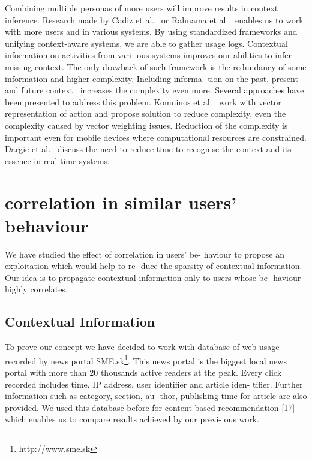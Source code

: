 \documentclass{acm_proc_article-sp} %
\begin{document}
Combining multiple personas of more users will improve
results in context inference. Research made by Cadiz et al.~\cite{cadiz2009orchestrating}
or Rahnama et al.~\cite{rahnama2011campus} enables us to work with more users
and in various systems. By using standardized frameworks
and unifying context-aware systems, we are able to gather
usage logs. Contextual information on activities from vari-
ous systems improves our abilities to infer missing context.
The only drawback of such framework is the redundancy of
some information and higher complexity. Including informa-
tion on the past, present and future context~\cite{oku2010recommendation} increases
the complexity even more. Several approaches have been
presented to address this problem. Komninos et al.~\cite{stefanis2014frequency} work
with vector representation of action and propose solution
to reduce complexity, even the complexity caused by vector
weighting issues. Reduction of the complexity is important
even for mobile devices where computational resources are
constrained. Dargie et al.~\cite{dargie2011context} discuss the need to reduce time
to recognise the context and its essence in real-time systems.

\section{correlation in similar users' behaviour}

We have studied the effect of correlation in users' be-
haviour to propose an exploitation which would help to re-
duce the sparsity of contextual information. Our idea is to
propagate contextual information only to users whose be-
haviour highly correlates.

\subsection{Contextual Information}

To prove our concept we have decided to work with database
of web usage recorded by news portal SME.sk\footnote{http://www.sme.sk}. This news
portal is the biggest local news portal with more than 20
thousands active readers at the peak. Every click recorded
includes time, IP address, user identifier and article iden-
tifier. Further information such as category, section, au-
thor, publishing time for article are also provided. We used
this database before for content-based recommendation [17]
which enables us to compare results achieved by our previ-
ous work.
\end{document}
